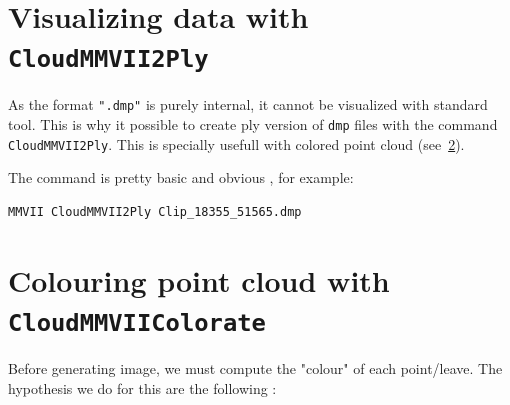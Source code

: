 
\section{Visualizing data with {\tt CloudMMVII2Ply}}

As the format {\tt ".dmp"} is purely internal, it cannot be visualized with standard tool.
This is why it possible to create ply version of {\tt dmp} files with the command 
{\tt CloudMMVII2Ply}.  This is specially usefull with colored point cloud
(see~\ref{Cloud::Colorate}).

The command is pretty basic and obvious , for example: 

\begin{verbatim}
MMVII CloudMMVII2Ply Clip_18355_51565.dmp
\end{verbatim}


\section{Colouring point cloud with {\tt CloudMMVIIColorate}}

\label{Cloud::Colorate}


Before generating image, we must compute the "colour" of each point/leave. The hypothesis
we do for this are the following :


